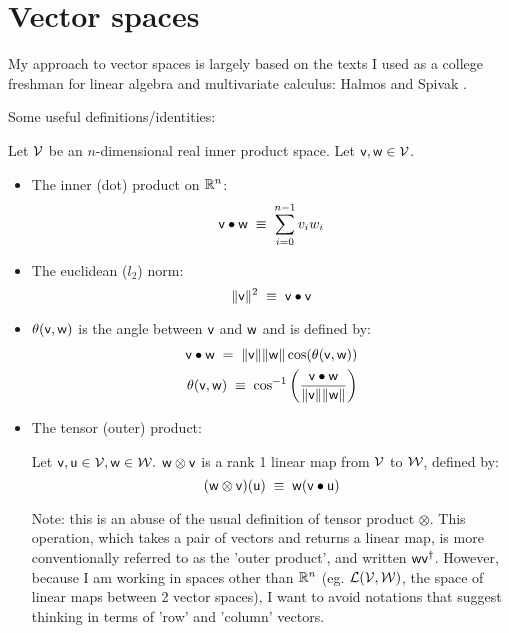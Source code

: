 
\section{Vector spaces}
\label{sec:vector-spaces}

My approach to vector spaces is largely based on
the texts I used as a college freshman for linear algebra and
multivariate calculus: Halmos \cite{halmos-1958}
and Spivak \cite{spivak-1965}.

Some useful definitions/identities:

Let $\mathcal{V}$ be an $n$-dimensional real inner product space.
Let $\mathsf{v}, \mathsf{w} \in \mathcal{V}$.

\begin{itemize}
\item The inner (dot) product on $\mathbb{R}^n$:
\begin{equation}
\mathsf{v} \bullet \mathsf{w} \; \equiv \; \sum_{i=0}^{n-1} v_i w_i
\end{equation}

\item The euclidean ($l_2$) norm:
\begin{equation}
\| \mathsf{v} \|^2 \; \equiv \; \mathsf{v} \bullet \mathsf{v}
\end{equation}

\item $\theta(\mathsf{v},\mathsf{w})$ is the angle between $\mathsf{v}$ and $\mathsf{w}$
and is defined by:
\begin{eqnarray}
\mathsf{v} \bullet \mathsf{w} \; = \; \| \mathsf{v} \| \| \mathsf{w} \| \cos(\theta(\mathsf{v},\mathsf{w}))
\\
\theta(\mathsf{v},\mathsf{w})
\; \equiv \;
\cos^{-1} \left(\frac{ \mathsf{v} \bullet \mathsf{w} }{\| \mathsf{v} \| \| \mathsf{w} \| } \right)
\nonumber
\end{eqnarray}

\item The tensor (outer) product:

Let $\mathsf{v}, \mathsf{u} \in \mathcal{V}, \mathsf{w} \in \mathcal{W}.$
$\mathsf{w} \otimes \mathsf{v}$ is a rank 1 linear map
from $\mathcal{V}$ to $\mathcal{W}$, defined by:
\begin{equation}
(\mathsf{w} \otimes \mathsf{v})(\mathsf{u}) \; \equiv \; \mathsf{w} (\mathsf{v} \bullet \mathsf{u})
\end{equation}

Note: this is an abuse of the usual definition of tensor product $\otimes$.
This operation, which takes a pair of vectors and returns a linear map,
is more conventionally referred to as the 'outer product',
and written $\mathsf{w} \mathsf{v}^{\dagger}$.
However, because I am working in spaces other than $\mathbb{R}^n$
(eg. $\mathcal{L}(\mathcal{V},\mathcal{W})$, the space of linear maps
between 2 vector spaces),
I want to avoid notations that suggest thinking in terms
of 'row' and 'column' vectors.


\end{itemize}
